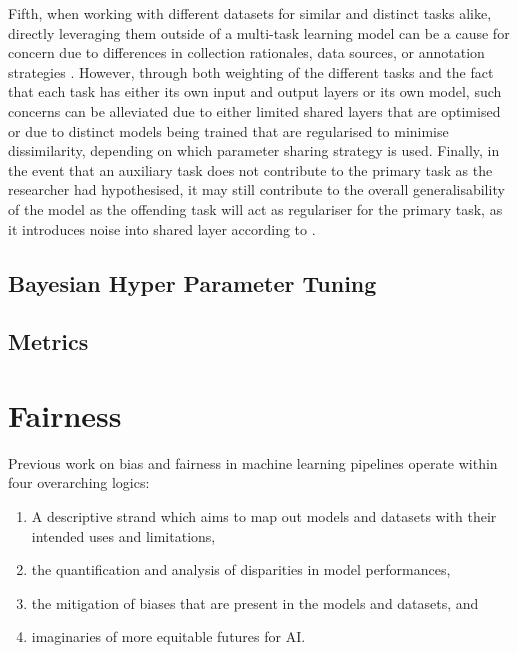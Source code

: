 Fifth, when working with different datasets for similar and distinct tasks alike, directly leveraging them outside of a multi-task learning model can be a cause for concern due to differences in collection rationales, data sources, or annotation strategies \cite{Waseem:2018}. However, through both weighting of the different tasks and the fact that each task has either its own input and output layers or its own model, such concerns can be alleviated due to either limited shared layers that are optimised or due to distinct models being trained that are regularised to minimise dissimilarity, depending on which parameter sharing strategy is used.
Finally, in the event that an auxiliary task does not contribute to the primary task as the researcher had hypothesised, it may still contribute to the overall generalisability of the model as the offending task will act as regulariser for the primary task, as it introduces noise into shared layer according to \cite{CITE: Cite paper that argues the regularising effect of aux tasks}.



\subsection{Bayesian Hyper Parameter Tuning}\label{sub:bho}

\subsection{Metrics}


\section{Fairness}\label{sec:fairlitt}

Previous work on bias and fairness in machine learning pipelines operate within four overarching logics:

\begin{enumerate}
  \item{A descriptive strand which aims to map out models and datasets with their intended uses and limitations, }
  \item{the quantification and analysis of disparities in model performances,}
  \item{the mitigation of biases that are present in the models and datasets, and}
  \item{imaginaries of more equitable futures for AI.}
\end{enumerate}

